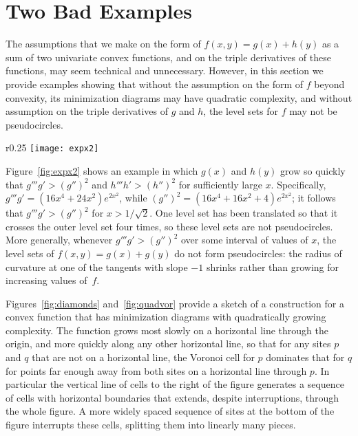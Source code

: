 \documentclass[10pt, conference, compsocconf]{IEEEtran}
\begin{document}
\section{Two Bad Examples}
\label{sec:bad-examples}

The assumptions that we make on the form of $f(x,y)=g(x)+h(y)$ as a sum of two univariate convex functions, and on the triple derivatives of these functions, may seem technical and unnecessary. However, in this section we provide examples showing that without the assumption on the form of $f$ beyond convexity, its minimization diagrams may have quadratic complexity, and without assumption on the triple derivatives of $g$ and $h$, the level sets for $f$ may not be pseudocircles.

\begin{wrapfigure}{r}{0.25\textwidth}
\centering\texttt{[image: expx2]}
\caption{The level sets for $f(x,y)=e^{x^2}+e^{y^2}$ (shown for function values $2.5$, $5$, $10$, $20$, $40$, $80$, and $160$) do not form pseudocircles.}
\label{fig:expx2}
\end{wrapfigure}

Figure~\ref{fig:expx2} shows an example in which $g(x)$ and $h(y)$ grow so quickly that $g'''g'>(g'')^2$ and $h'''h'>(h'')^2$ for sufficiently large $x$.
Specifically, $g'''g'=(16x^4+24x^2)e^{2x^2}$, while $(g'')^2=(16x^4+16x^2+4)e^{2x^2}$; it follows that $g'''g'>(g'')^2$ for $x>1/\sqrt 2$. One level set has been translated so that it crosses the outer level set four times, so these level sets are not pseudo\-circles.
More generally, whenever $g'''g'>(g'')^2$ over some interval of values of $x$, the level sets of $f(x,y)=g(x)+g(y)$ do not form pseudocircles: the radius of curvature at one of the tangents with slope $-1$ shrinks rather than growing for increasing values of~$f$.

Figures~\ref{fig:diamonds} and~\ref{fig:quadvor} provide a sketch of a construction for a convex function that has minimization diagrams with quadratically growing complexity. The function grows most slowly on a horizontal line through the origin, and more quickly along any other horizontal line, so that for any sites $p$ and $q$ that are not on a horizontal line, the Voronoi cell for $p$ dominates that for $q$ for points far enough away from both sites on a horizontal line through $p$. In particular the vertical line of cells to the right of the figure generates a sequence of cells with horizontal boundaries that extends, despite interruptions, through the whole figure. A more widely spaced sequence of sites at the bottom of the figure interrupts these cells, splitting them into linearly many pieces.
\end{document}
